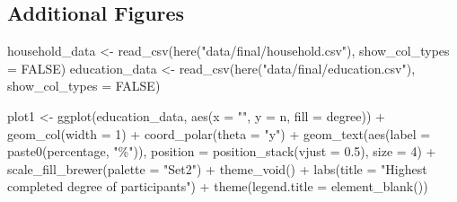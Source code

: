 \documentclass[
  letterpaper,
  DIV=11,
  numbers=noendperiod]{scrartcl}
\newenvironment{Shaded}{\begin{snugshade}}{\end{snugshade}}
\newcommand{\AttributeTok}[1]{\textcolor[rgb]{0.40,0.45,0.13}{#1}}
\newcommand{\ConstantTok}[1]{\textcolor[rgb]{0.56,0.35,0.01}{#1}}
\newcommand{\DecValTok}[1]{\textcolor[rgb]{0.68,0.00,0.00}{#1}}
\newcommand{\FloatTok}[1]{\textcolor[rgb]{0.68,0.00,0.00}{#1}}
\newcommand{\FunctionTok}[1]{\textcolor[rgb]{0.28,0.35,0.67}{#1}}
\newcommand{\NormalTok}[1]{\textcolor[rgb]{0.00,0.23,0.31}{#1}}
\newcommand{\OtherTok}[1]{\textcolor[rgb]{0.00,0.23,0.31}{#1}}
\newcommand{\SpecialCharTok}[1]{\textcolor[rgb]{0.37,0.37,0.37}{#1}}
\newcommand{\StringTok}[1]{\textcolor[rgb]{0.13,0.47,0.30}{#1}}
\begin{document}
\subsection{Additional Figures}\label{additional-figures}

\begin{Shaded}
\begin{Highlighting}[]
\NormalTok{household\_data }\OtherTok{\textless{}{-}} \FunctionTok{read\_csv}\NormalTok{(}\FunctionTok{here}\NormalTok{(}\StringTok{"data/final/household.csv"}\NormalTok{), }\AttributeTok{show\_col\_types =} \ConstantTok{FALSE}\NormalTok{)}
\NormalTok{education\_data }\OtherTok{\textless{}{-}} \FunctionTok{read\_csv}\NormalTok{(}\FunctionTok{here}\NormalTok{(}\StringTok{"data/final/education.csv"}\NormalTok{), }\AttributeTok{show\_col\_types =} \ConstantTok{FALSE}\NormalTok{)}

\NormalTok{plot1 }\OtherTok{\textless{}{-}} \FunctionTok{ggplot}\NormalTok{(education\_data, }\FunctionTok{aes}\NormalTok{(}\AttributeTok{x =} \StringTok{""}\NormalTok{, }\AttributeTok{y =}\NormalTok{ n, }\AttributeTok{fill =}\NormalTok{ degree)) }\SpecialCharTok{+}
  \FunctionTok{geom\_col}\NormalTok{(}\AttributeTok{width =} \DecValTok{1}\NormalTok{) }\SpecialCharTok{+}
  \FunctionTok{coord\_polar}\NormalTok{(}\AttributeTok{theta =} \StringTok{"y"}\NormalTok{) }\SpecialCharTok{+}
  \FunctionTok{geom\_text}\NormalTok{(}\FunctionTok{aes}\NormalTok{(}\AttributeTok{label =} \FunctionTok{paste0}\NormalTok{(percentage, }\StringTok{"\%"}\NormalTok{)),}
            \AttributeTok{position =} \FunctionTok{position\_stack}\NormalTok{(}\AttributeTok{vjust =} \FloatTok{0.5}\NormalTok{),}
            \AttributeTok{size =} \DecValTok{4}\NormalTok{) }\SpecialCharTok{+}
  \FunctionTok{scale\_fill\_brewer}\NormalTok{(}\AttributeTok{palette =} \StringTok{"Set2"}\NormalTok{) }\SpecialCharTok{+}
  \FunctionTok{theme\_void}\NormalTok{() }\SpecialCharTok{+}
  \FunctionTok{labs}\NormalTok{(}\AttributeTok{title =} \StringTok{"Highest completed degree of participants"}\NormalTok{) }\SpecialCharTok{+} 
  \FunctionTok{theme}\NormalTok{(}\AttributeTok{legend.title =} \FunctionTok{element\_blank}\NormalTok{())}


\end{Highlighting}
\end{Shaded}
\end{document}
